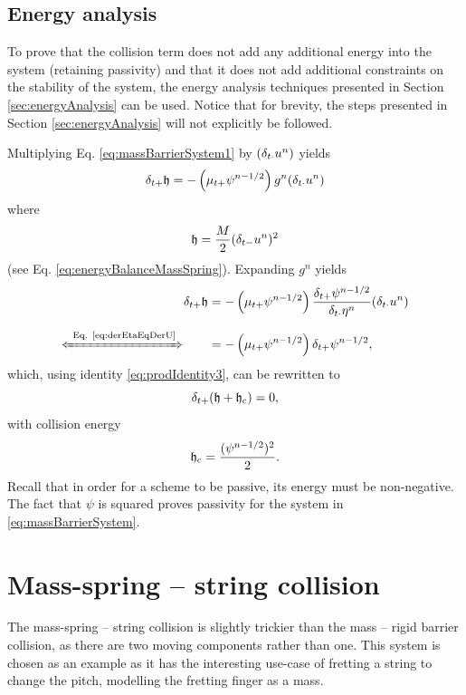 \subsection{Energy analysis}\label{sec:energyAnalysisMassBarrier}
To prove that the collision term does not add any additional energy into the system (retaining passivity) and that it does not add additional constraints on the stability of the system, the energy analysis techniques presented in Section \ref{sec:energyAnalysis} can be used. Notice that for brevity, the steps presented in Section \ref{sec:energyAnalysis} will not explicitly be followed.

Multiplying Eq. \eqref{eq:massBarrierSystem1} by $(\delta_{t\cdot} u^n)$ yields 
\begin{equation*}
    \delta_{t+} \mathfrak{h}  = -\left(\mu_{t+}\psi^{n-1/2}\right)g^n (\delta_{t\cdot} u^n)
\end{equation*}
where
\begin{equation}
    \mathfrak{h} = \frac{M}{2}(\delta_{t-}u^n)^2
\end{equation}
(see Eq. \eqref{eq:energyBalanceMassSpring}). Expanding $g^n$ yields 
\begin{align*}
    \dtp \h  &= -\left(\mtp\psi^{n-1/2}\right)\frac{\dtp \psi^{n-1/2}}{\dtd \eta^n}(\dtd \un)\\
    \xLeftrightarrow{\mystrut\ \text{Eq. \eqref{eq:derEtaEqDerU}}} \qquad & = -\left(\mtp\psi^{n-1/2}\right)\dtp \psi^{n-1/2},
\end{align*}
which, using identity \eqref{eq:prodIdentity3}, can be rewritten to 
\begin{equation}
    \delta_{t+}(\mathfrak{h} + \mathfrak{h}_{\text{c}}) = 0,
\end{equation}
with collision energy
\begin{equation}\label{eq:collisionEnergy}
    \mathfrak{h}_{\text{c}} = \frac{(\psi^{n-1/2})^2}{2}.
\end{equation}
Recall that in order for a scheme to be passive, its energy must be non-negative. The fact that $\psi$ is squared proves passivity for the system in \eqref{eq:massBarrierSystem}.

\section{Mass-spring -- string collision}\label{sec:massString}
The mass-spring -- string collision is slightly trickier than the mass -- rigid barrier collision, as there are two moving components rather than one. This system is chosen as an example as it has the interesting use-case of fretting a string to change the pitch, modelling the fretting finger as a mass.

